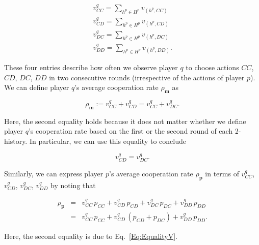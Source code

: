 \documentclass{article}
\theoremstyle{definition}
\begin{document}
\begin{equation}
\begin{array}{l}
\displaystyle v^q_{CC} = \sum_{h^p\in H^p} v_{(h^p,CC)}\\
\displaystyle v^q_{CD} = \sum_{h^p\in H^p} v_{(h^p,CD)}\\
\displaystyle v^q_{DC} = \sum_{h^p\in H^p} v_{(h^p,DC)}\\
\displaystyle v^q_{DD} = \sum_{h^p\in H^p} v_{(h^p,DD)}.
\end{array}
\end{equation}

These four entries describe how often we observe player $q$ to choose actions
$CC$, $CD$, $DC$, $DD$ in two consecutive rounds (irrespective of the actions of
player $p$). We can define player $q$'s average cooperation rate $\rho_\mathbf{m}$ as 

\begin{equation} \label{Eq:rhoq_n2}
\rho_\mathbf{m} := v^q_{CC} + v^q_{CD} = v^q_{CC} + v^q_{DC}.
\end{equation}

Here, the second equality holds because it does not matter whether we define
player $q$'s cooperation rate based on the first or the second round of each
2-history. In particular, we can use this equality to conclude

\begin{equation} \label{Eq:EqualityV}
v^q_{CD} = v^q_{DC}.
\end{equation}

Similarly, we can express player $p$'s average cooperation rate
$\rho_\mathbf{p}$ in terms of $v^q_{CC}$, $v^q_{CD}$, $v^q_{DC}$, $v^q_{DD}$ by
noting that

\begin{equation} \label{Eq:rhop_n2}
\begin{array}{lll}
\rho_\mathbf{p} &= &\displaystyle v^q_{CC}\, p_{CC} +  v^q_{CD}\,p_{CD} + v^q_{DC}\, p_{DC} + v^q_{DD}\, p_{DD}\\[0.2cm]
	& =  &v^q_{CC}\, p_{CC} +  v^q_{CD}\,(p_{CD}\!+\!p_{DC}) + v^q_{DD}\, p_{DD}.
\end{array}
\end{equation}

Here, the second equality is due to Eq.~\eqref{Eq:EqualityV}.

 
\end{document}
